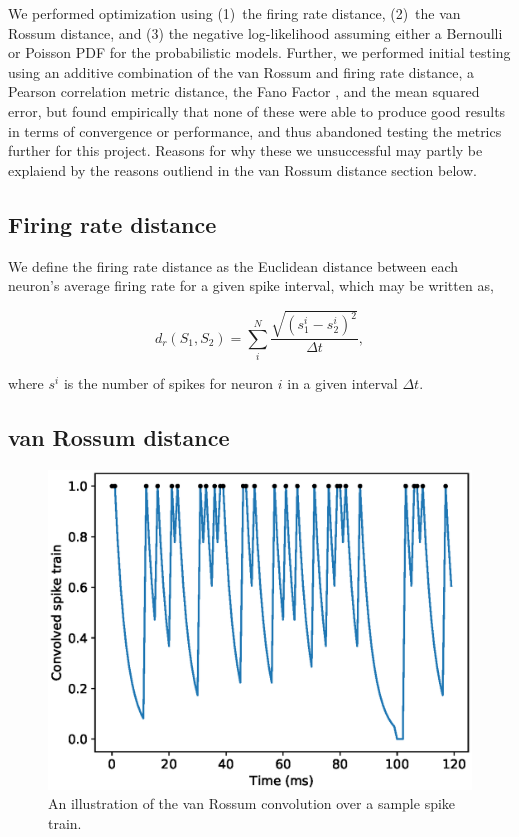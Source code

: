 \documentclass[mphil,deptreport,ianc]{infthesis} %
\begin{document}
We performed optimization using (1)~the firing rate distance, (2)~the van Rossum distance, and (3) the negative log-likelihood assuming either a Bernoulli or Poisson PDF for the probabilistic models.
Further, we performed initial testing using an additive combination of the van Rossum and firing rate distance, a Pearson correlation metric distance, the Fano Factor \cite{Tchumatchenko2011, Kreuz2013a}, and the mean squared error, but found empirically that none of these were able to produce good results in terms of convergence or performance, and thus abandoned testing the metrics further for this project.
Reasons for why these we unsuccessful may partly be explaiend by the reasons outliend in the van Rossum distance section below.

\subsection{Firing rate distance}

We define the firing rate distance as the Euclidean distance between each neuron's average firing rate for a given spike interval, which may be written as,

\begin{equation}
    d_r(S_1, S_2) = \sum_i^N{\frac{\sqrt{(s_1^i - s_2^i)^2}}{\Delta t}},
\end{equation}

where $s^i$ is the number of spikes for neuron $i$ in a given interval $\Delta t$.

\subsection{van Rossum distance}

\begin{figure}
    \centering
    \vskip -0.1in
    \includegraphics[width=0.9\columnwidth]{figures/samples/neur_vr_conv_sample.eps}
    \vskip -0.1in
    \caption{An illustration of the van Rossum convolution over a sample spike train.}
    \label{fig:vrd_conv_sample}
    \vskip -0.2in
\end{figure}
\end{document}

